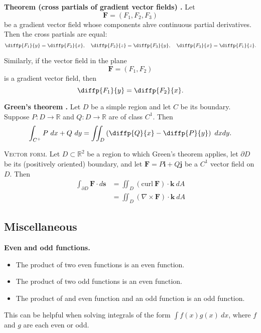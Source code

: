 \begin{shaded}
\textbf{Theorem (cross partials of gradient vector fields) \cite{math2111_notes}.} Let
$$ \mathbf{F} = (F_1, F_2, F_3) $$
be a gradient vector field whose components ahve continuous partial derivatives. Then the cross partials are equal:
$$ \diffp{F_1}{y} = \diffp{F_2}{x}, \quad \diffp{F_2}{z} = \diffp{F_3}{y}, \quad \diffp{F_3}{x} = \diffp{F_1}{z} . $$

Similarly, if the vector field in the plane
$$ \mathbf{F} = (F_1, F_2) $$
is a gradient vector field, then
$$ \diffp{F_1}{y} = \diffp{F_2}{x} . $$
\end{shaded}

\begin{shaded}
\textbf{Green's theorem \cite{marsden_vector_calculus}.} Let $D$ be a simple region and let $C$ be its boundary. Suppose $P: D \to \mathbb{R}$ and $Q: D \to \mathbb{R}$ are of class $C^1$. Then
$$ \int_{C^+} P \ dx + Q \ dy = \iint_D \left( \diffp{Q}{x} - \diffp{P}{y} \right) \ dx dy . $$

\textsc{Vector form.} Let $D \subset \mathbb{R}^2$ be a region to which Green's theorem applies, let $\partial D$ be its (positively oriented) boundary, and let $\mathbf{F} = P \mathbf{i} + Q \mathbf{j}$ be a $C^1$ vector field on $D$. Then
\begin{align*}
\int_{\partial D} \mathbf{F} \cdot d\mathbf{s} &= \iint_D (\text{curl} \ \mathbf{F}) \cdot \mathbf{k} \ dA \\
&= \iint_D (\nabla \times \mathbf{F}) \cdot \mathbf{k} \ dA
\end{align*}
\end{shaded}

\subsection{Miscellaneous}

\begin{shaded}
\textbf{Even and odd functions.}
\begin{itemize}
	\item The product of two even functions is an even function.
	\item The product of two odd functions is an even function.
	\item The product of and even function and an odd function is an odd function.
\end{itemize}

This can be helpful when solving integrals of the form $\int f(x)g(x) \ dx$, where $f$ and $g$ are each even or odd.
\end{shaded}